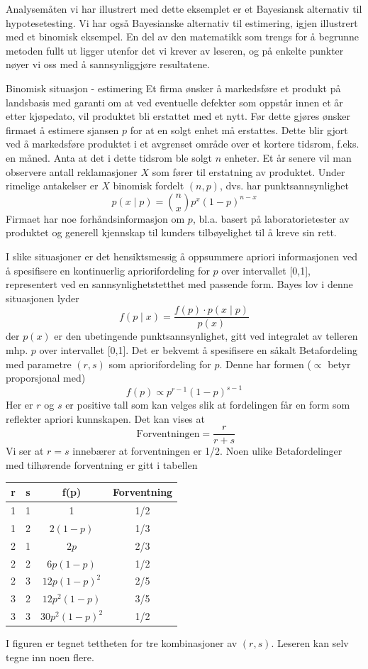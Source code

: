 {{Analysemåten vi har illustrert med dette eksemplet er et Bayesiansk
alternativ til hypotesetesting. Vi har også Bayesianske alternativ
til estimering, igjen illustrert med et binomisk eksempel.
En del av den matematikk som trengs for å begrunne metoden fullt ut
ligger utenfor det vi krever av leseren, og på enkelte punkter
nøyer vi oss med å sannsynliggjøre resultatene.\\

\begin{eksempel}{Binomisk situasjon - estimering}
Et firma ønsker å markedsføre et produkt på landsbasis med 
garanti om at ved eventuelle defekter som oppstår innen et år etter 
kjøpedato, vil produktet bli erstattet med et nytt. Før dette gjøres
ønsker firmaet å estimere sjansen $p$ for at en solgt enhet må
erstattes. Dette blir gjort ved å markedsføre produktet i et avgrenset 
område over et kortere tidsrom, f.eks. en måned.
Anta at det i dette tidsrom ble solgt $n$ enheter. Et år senere vil man
observere antall reklamasjoner $X$ som fører til erstatning av produktet.
Under rimelige antakelser er $X$ binomisk fordelt $(n,p)$, dvs.
har punktsannsynlighet
\[ p(x\mid p) = {n\choose x} p^x (1-p)^{n-x} \]
Firmaet har noe forhåndsinformasjon om $p$, bl.a. basert på
laboratorietester av produktet og generell kjennskap til kunders
tilbøyelighet til å kreve sin rett.

I slike situasjoner er det hensiktsmessig å oppsummere  apriori
informasjonen ved å spesifisere en kontinuerlig apriorifordeling for
$p$ over intervallet [0,1], representert ved en sannsynlighetstetthet
med passende form. Bayes lov i denne situasjonen lyder
\[ f(p \mid x) = \frac{f(p)\cdot p(x\mid p)}{p(x)}   \] 
der $p(x)$ er den ubetingende punktsannsynlighet, gitt ved integralet av
telleren mhp. $p$ over intervallet [0,1].
Det er bekvemt å spesifisere en såkalt Betafordeling med parametre 
$(r,s)$ som apriorifordeling for $p$. Denne har formen ($\propto$ betyr
proporsjonal med)
\[  f(p) \propto p^{r-1}(1-p)^{s-1}  \]
Her er $r$ og $s$ er positive tall som kan velges slik at fordelingen får
en form som reflekter apriori kunnskapen. Det kan vises at
\[ \mbox{ Forventningen} = \frac{r}{r+s}  \]
Vi ser at $r=s$ innebærer at forventningen er 1/2.
Noen ulike Betafordelinger med tilhørende forventning er gitt i tabellen
\begin{center}
\begin{tabular}{cc|cc}
 r & s &      f(p)      & Forventning \\ \hline
 1 & 1 &       1        &  1/2        \\
 1 & 2 &    $2(1-p)$    &  1/3        \\
 2 & 1 &    $2p$        &  2/3        \\
 2 & 2 &   $6p(1-p)$    &  1/2        \\
 2 & 3 &  $12p(1-p)^2$  &  2/5        \\
 3 & 2 &  $12p^2(1-p)$  &  3/5        \\
 3 & 3 & $30p^2(1-p)^2$ &  1/2      \\ \hline
\end{tabular}
\end{center}
I figuren er tegnet tettheten for tre kombinasjoner av $(r,s)$.
Leseren kan selv tegne inn noen flere.



\end{eksempel}}}
